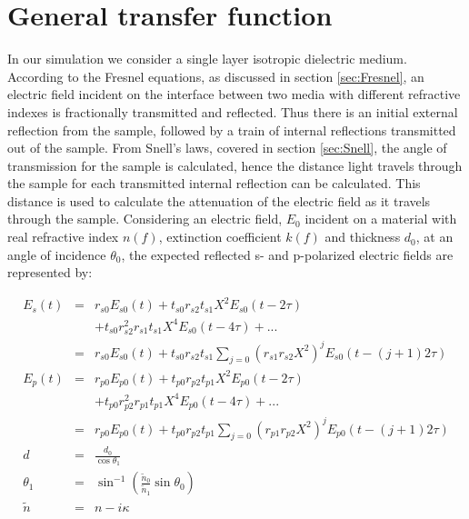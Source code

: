 \section{General transfer function}
\label{sec:LMI}
In our simulation we consider a single layer isotropic dielectric medium. According to the Fresnel equations, as discussed in section \ref{sec:Fresnel}, an electric field incident on the interface between two media with different refractive indexes is fractionally transmitted and reflected. Thus there is an initial external reflection from the sample, followed by a train of internal reflections transmitted out of the sample. From Snell's laws, covered in section \ref{sec:Snell}, the angle of transmission for the sample is calculated, hence the distance light travels through the sample for each transmitted internal reflection can be calculated. This distance is used to calculate the attenuation of the electric field as it travels through the sample. Considering an electric field, $E_{0}$ incident on a material
with real refractive index $n(f)$, extinction coefficient $k(f)$ and thickness $d_{0}$, at an angle of incidence $\theta_{0}$, the expected reflected s- and p-polarized electric fields are represented by:

\begin{eqnarray}
E_{s}(t) &=& r_{s0}E_{s0}(t) + t_{s0}r_{s2}t_{s1}X^{2}E_{s0}(t-2\tau)\nonumber\\& &+ t_{s0}r_{s2}^{2}r_{s1}t_{s1}X^{4}E_{s0}(t-4\tau) + ...\\
&=& r_{s0}E_{s0}(t) + t_{s0}r_{s2}t_{s1}\sum_{j=0}{(r_{s1}r_{s2}X^{2})^{j}E_{s0}(t - (j+1)2\tau)}\label{eq:tss}\\
E_{p}(t) &=& r_{p0}E_{p0}(t) + t_{p0}r_{p2}t_{p1}X^{2}E_{p0}(t-2\tau)\nonumber\\& & + t_{p0}r_{p2}^{2}r_{p1}t_{p1}X^{4}E_{p0}(t-4\tau) + ...\\
&=& r_{p0}E_{p0}(t) + t_{p0}r_{p2}t_{p1}\sum_{j=0}{(r_{p1}r_{p2}X^{2})^{j}E_{p0}(t - (j+1)2\tau)}\label{eq:tpp}\\
d &=& \frac{d_{0}}{\cos{\theta_{1}}}\\
\theta_{1} &=& \sin^{-1}{\left(\frac{\widetilde{n}_{0}}{\widetilde{n}_{1}}\sin{\theta_{0}}\right)}\\
\widetilde{n} &=& n - i\kappa
\end{eqnarray}

